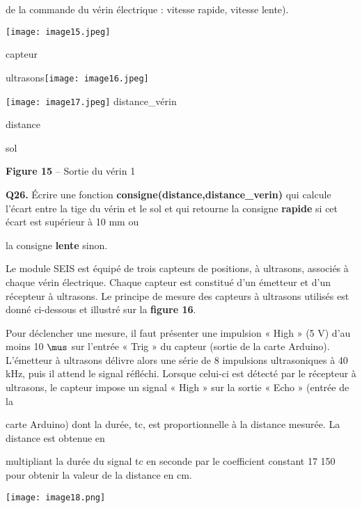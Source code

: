 de la commande du vérin électrique : vitesse rapide, vitesse lente).

\texttt{[image: image15.jpeg]}

capteur

ultrasons\texttt{[image: image16.jpeg]}

\texttt{[image: image17.jpeg]}
distance\_vérin

distance

sol

\textbf{Figure 15} -- Sortie du vérin 1

\textbf{Q26.} Écrire une fonction
\textbf{consigne(distance,distance\_verin)} qui calcule l'écart entre la
tige du vérin et le sol et qui retourne la consigne \textbf{rapide} si
cet écart est supérieur à 10 mm ou

la consigne \textbf{lente} sinon.

Le module SEIS est équipé de trois
capteurs de positions, à ultrasons, associés à chaque vérin électrique.
Chaque capteur est constitué d'un émetteur et d'un récepteur à
ultrasons. Le principe de mesure des capteurs à ultrasons utilisés est
donné ci-dessous et illustré sur la \textbf{figure 16}.

Pour déclencher une mesure, il faut présenter une impulsion « High » (5
V) d'au moins 10 $\mus$ sur l'entrée « Trig » du capteur (sortie de la carte
Arduino). L'émetteur à ultrasons délivre alors une série de 8 impulsions
ultrasoniques à 40 kHz, puis il attend le signal réfléchi. Lorsque
celui-ci est détecté par le récepteur à ultrasons, le capteur impose un
signal « High » sur la sortie « Echo » (entrée de la

carte Arduino) dont la durée, tc, est proportionnelle à la distance
mesurée. La distance est obtenue en

multipliant la durée du signal tc en seconde par le coefficient constant
17 150 pour obtenir la valeur de la distance en cm.

\texttt{[image: image18.png]}